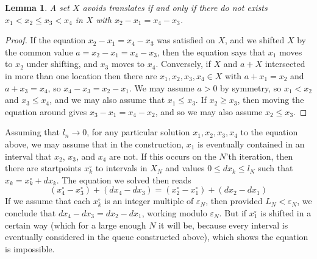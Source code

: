 \documentclass{article}
\theoremstyle{plain}
\newtheorem{lemma}{Lemma}
\theoremstyle{plain}
\begin{document}
\begin{lemma}
    A set $X$ avoids translates if and only if there do not exists $x_1 < x_2 \leq x_3 < x_4$ in $X$ with $x_2 - x_1 = x_4 - x_3$.
\end{lemma}
\begin{proof}
    If the equation $x_2 - x_1 = x_4 - x_3$ was satisfied on $X$, and we shifted $X$ by the common value $a = x_2 - x_1 = x_4 - x_3$, then the equation says that $x_1$ moves to $x_2$ under shifting, and $x_3$ moves to $x_4$. Conversely, if $X$ and $a + X$ intersected in more than one location then there are $x_1, x_2,x_3, x_4 \in X$ with $a + x_1 = x_2$ and $a + x_3 = x_4$, so $x_4 - x_3 = x_2 - x_1$. We may assume $a > 0$ by symmetry, so $x_1 < x_2$ and $x_3 \leq x_4$, and we may also assume that $x_1 \leq x_3$. If $x_2 \geq x_3$, then moving the equation around gives $x_3 - x_1 = x_4 - x_2$, and so we may also assume $x_2 \leq x_3$.
\end{proof}

Assuming that $l_n \to 0$, for any particular solution $x_1, x_2, x_3, x_4$ to the equation above, we may assume that in the construction, $x_1$ is eventually contained in an interval that $x_2$, $x_3$, and $x_4$ are not. If this occurs on the $N$'th iteration, then there are startpoints $x_k^\circ$ to intervals in $X_N$ and values $0 \leq dx_k \leq l_N$ such that $x_k = x_k^\circ + dx_k$. The equation we solved then reads
%
\[ (x_4^\circ - x_3^\circ) + (dx_4 - dx_3) = (x_2^\circ - x_1^\circ) + (dx_2 - dx_1) \]
%
If we assume that each $x_k^\circ$ is an integer multiple of $\varepsilon_N$, then provided $L_N < \varepsilon_N$, we conclude that $dx_4 - dx_3 = dx_2 - dx_1$, working modulo $\varepsilon_N$. But if $x_1^\circ$ is shifted in a certain way (which for a large enough $N$ it will be, because every interval is eventually considered in the queue constructed above), which shows the equation is impossible.
\end{document}

